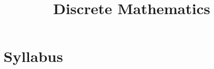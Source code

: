 \documentclass{notes}
\title{Discrete Mathematics}
\begin{document}
\section*{Syllabus}
\end{document}
